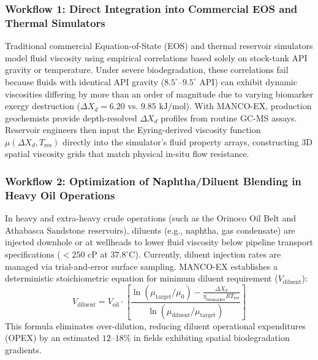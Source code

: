 \documentclass[review,12pt]{elsarticle}
\begin{document}
\subsubsection{Workflow 1: Direct Integration into Commercial EOS and Thermal Simulators}
Traditional commercial Equation-of-State (EOS) and thermal reservoir simulators model fluid viscosity using empirical correlations based solely on stock-tank API gravity or temperature. Under severe biodegradation, these correlations fail because fluids with identical API gravity ($8.5^\circ\text{--}9.5^\circ\text{ API}$) can exhibit dynamic viscosities differing by more than an order of magnitude due to varying biomarker exergy destruction ($\Delta X_d = 6.20\text{ vs. } 9.85\text{ kJ/mol}$). With MANCO-EX, production geochemists provide depth-resolved $\Delta X_d$ profiles from routine GC-MS assays. Reservoir engineers then input the Eyring-derived viscosity function $\mu(\Delta X_d, T_{\text{res}})$ directly into the simulator's fluid property arrays, constructing 3D spatial viscosity grids that match physical in-situ flow resistance.

\subsubsection{Workflow 2: Optimization of Naphtha/Diluent Blending in Heavy Oil Operations}
In heavy and extra-heavy crude operations (such as the Orinoco Oil Belt and Athabasca Sandstone reservoirs), diluents (e.g., naphtha, gas condensate) are injected downhole or at wellheads to lower fluid viscosity below pipeline transport specifications ($< 250\text{ cP}$ at $37.8^\circ\text{C}$). Currently, diluent injection rates are managed via trial-and-error surface sampling. MANCO-EX establishes a deterministic stoichiometric equation for minimum diluent requirement ($V_{\text{diluent}}$):
\begin{equation}
    V_{\text{diluent}} = V_{\text{oil}} \cdot \left[ \frac{\ln\left( \mu_{\text{target}} / \mu_0 \right) - \frac{\Delta X_d}{\eta_{\text{biomarker}} R T_{\text{res}}}}{\ln\left( \mu_{\text{diluent}} / \mu_{\text{target}} \right)} \right]
\end{equation}
This formula eliminates over-dilution, reducing diluent operational expenditures (OPEX) by an estimated $12\text{--}18\%$ in fields exhibiting spatial biodegradation gradients.
\end{document}
